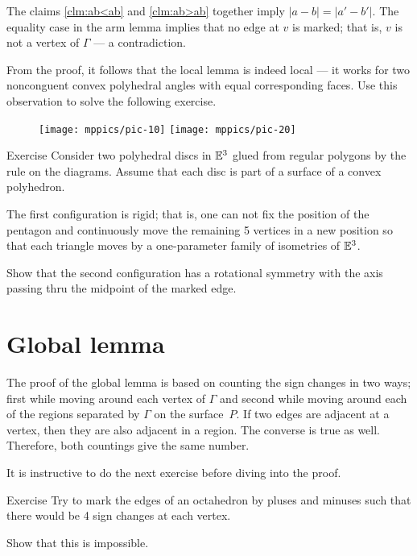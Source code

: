 The claims 
\ref{clm:ab<ab} and \ref{clm:ab>ab} 
together imply $|a-b|=|a'-b'|$.
The equality case in the arm lemma implies that no edge at $v$ is marked;
that is, $v$ is not a vertex of $\Gamma$
--- a contradiction.
\qeds

From the proof, it follows that the local lemma is indeed local --- it works for two nonconguent convex polyhedral angles with equal corresponding faces.
Use this observation to solve the following exercise.

\begin{wrapfigure}{r}{20mm}
\vskip-0mm
\centering
\texttt{[image: mppics/pic-10]}
\bigskip
\texttt{[image: mppics/pic-20]}
\vskip-0mm
\end{wrapfigure}

\begin{thm}{Exercise}\label{ex:disc-bend}
Consider two polyhedral discs in $\mathbb{E}^3$ glued from regular polygons by the rule on the diagrams.
Assume that each disc is part of a surface of a convex polyhedron.

\begin{subthm}{}
The first configuration is rigid; that is, one can not fix the position of the pentagon and continuously move the remaining 5 vertices in a new position so that each triangle moves by a one-parameter family of isometries of $\mathbb{E}^3$.
\end{subthm}

\begin{subthm}{}
Show that the second configuration has a rotational symmetry with the axis passing thru the midpoint of the marked edge.
\end{subthm}

\end{thm}

\section{Global lemma}

The proof of the global lemma is based on counting the sign changes 
in two ways;
first while moving around each vertex of $\Gamma$ 
and second while moving around each of the regions separated by $\Gamma$
on the surface~$P$. 
If two edges are adjacent at a vertex,
then they are also adjacent in a region. 
The converse is true as well. 
Therefore, both countings give the same number.

It is instructive to do the next exercise before diving into the proof.

\begin{thm}{Exercise}\label{ex:octahedron}
Try to mark the edges of an octahedron
by pluses and minuses
such that there would be 4 sign changes at each vertex.

Show that this is impossible.
\end{thm}

